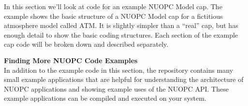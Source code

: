  
\setlength{\oldparskip}{\parskip}
\setlength{\parskip}{1.5ex}
\setlength{\oldparindent}{\parindent}
\setlength{\parindent}{0pt}
\setlength{\oldbaselineskip}{\baselineskip}
\setlength{\baselineskip}{11pt}
 
\def\bv{\begin{verbatim}}
\def\ev{\end{verbatim}}
\def\be{\begin{equation}}
\def\ee{\end{equation}}
\def\bea{\begin{eqnarray}}
\def\eea{\end{eqnarray}}
\def\bi{\begin{itemize}}
\def\ei{\end{itemize}}
\def\bn{\begin{enumerate}}
\def\en{\end{enumerate}}
\def\bd{\begin{description}}
\def\ed{\end{description}}
\def\({\left (}
\def\){\right )}
\def\[{\left [}
\def\]{\right ]}
\def\<{\left  \langle}
\def\>{\right \rangle}
\def\cI{{\cal I}}
\def\diag{\mathop{\rm diag}}
\def\tr{\mathop{\rm tr}}


 

   \label{sec:atmexample}
  
   In this section we'll look at code for an example NUOPC Model cap.
   The example shows the basic structure of a NUOPC Model cap for a fictitious
   atmosphere model called ATM. It is slightly simpler than a ``real'' cap,
   but has enough detail to show the basic coding structures.
   Each section of the example cap code will be broken down and described separately.
  
   \textbf{Finding More NUOPC Code Examples}
   \\
   In addition to the example code in this section, the
   repository contains many small example applications that are helpful
   for understanding the architecture of NUOPC applications and showing
   example uses of the NUOPC API.  These example applications can be
   compiled and executed on your system.
  

